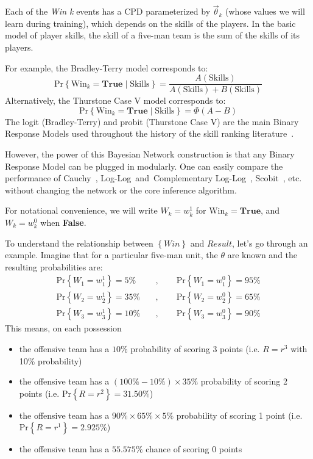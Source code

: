 \documentclass[10pt,twocolumn]{article}
\newcommand{\prb}[1]{\ensuremath{  \mathrm{Pr}\left\{ #1 \right\}  }}
\begin{document}
Each of the \emph{Win k} events has a CPD parameterized by $\vec \theta_k$ (whose values we will learn during training), which depends on the skills of the players.
In the basic model of player skills, the skill of a five-man team is the sum of the skills of its players.

For example, the Bradley-Terry model corresponds to:
\[
\prb{\mathrm{Win}_k = \mathbf{True} \mid \mathrm{Skills} } = \frac{ A\left(\mathrm{Skills}\right) } { A\left(\mathrm{Skills}\right) + B\left(\mathrm{Skills}\right) }
\]%
Alternatively, the Thurstone Case V model corresponds to:
\[
\prb{\mathrm{Win}_k = \mathbf{True} \mid \mathrm{Skills} } = \Phi\left( A - B \right)
\]%
The logit (Bradley-Terry) and probit (Thurstone Case V) are the main Binary Response Models used throughout the history of the skill ranking literature~\cite{elo1978rating,glickman1999parameter,herbrich2007trueskilltm,coulom2008whole}.

However, the power of this Bayesian Network construction is that any Binary Response Model can be plugged in modularly.
One can easily compare the performance of Cauchy~\cite{franklinPolisciWiscEduMLELec07p4up}, Log-Log~and~Complementary Log-Log~\cite{long1997regression}, Scobit~\cite{nagler1994scobit}, etc. without changing the network or the core inference algorithm.

For notational convenience, we will write $W_k = w_k^1$ for $\mathrm{Win}_k = \mathbf{True}$, and $W_k = w_k^0$ when {\bf False}.

To understand the relationship between $\left\{Win\right\}$ and $Result$, let's go through an example.
Imagine that for a particular five-man unit, the $\theta$ are known and the resulting probabilities are:
\begin{align*}
\prb{W_1=w_1^1} = 5\% \quad&, \quad\quad \prb{W_1=w_1^0} = 95\%
\\
\prb{W_2=w_2^1} = 35\% \quad&, \quad\quad \prb{W_2=w_2^0} = 65\%
\\
\prb{W_3=w_3^1} = 10\% \quad&, \quad\quad \prb{W_3=w_3^0} = 90\%
\end{align*}%
This means, on each possession
\begin{itemize}
\item the offensive team has a $10\%$ probability of scoring 3 points (i.e. $R=r^3$ with 10\% probability)
\item the offensive team has a $\left(100\% - 10\%\right) \times 35\%$ probability of scoring 2 points (i.e. $\prb{R=r^2}=31.50\%$)
\item the offensive team has a $90\% \times 65\% \times 5\%$ probability of scoring 1 point (i.e. $\prb{R=r^1}=2.925\%$)
\item the offensive team has a $55.575\%$ chance of scoring 0 points
\end{itemize}
\end{document}
